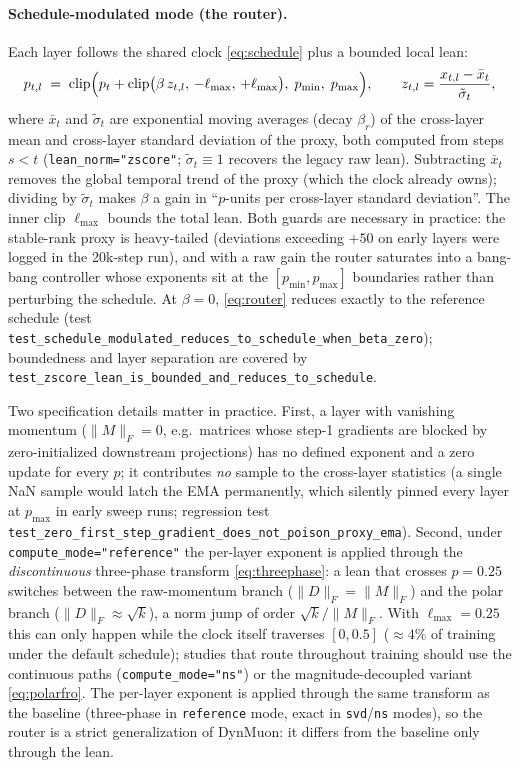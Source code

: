 \documentclass{article}
\DeclareMathOperator{\clip}{clip}
\begin{document}
\paragraph{Schedule-modulated mode (the router).} Each layer follows the
shared clock \eqref{eq:schedule} plus a bounded local lean:
\begin{equation}
\label{eq:router}
p_{t,l} \;=\; \clip\Bigl(p_t +
\clip\bigl(\beta\, z_{t,l},\, -\ell_{\max},\, +\ell_{\max}\bigr),\;
p_{\min},\; p_{\max}\Bigr),
\qquad
z_{t,l} = \frac{x_{t,l} - \bar{x}_t}{\tilde{\sigma}_t},
\end{equation}
where $\bar x_t$ and $\tilde\sigma_t$ are exponential moving averages (decay
$\beta_r$) of the cross-layer mean and cross-layer standard deviation of the
proxy, both computed from steps $s < t$ (\texttt{lean\_norm="zscore"};
$\tilde\sigma_t \equiv 1$ recovers the legacy raw lean). Subtracting
$\bar x_t$ removes the global temporal trend of the proxy (which the clock
already owns); dividing by $\tilde\sigma_t$ makes $\beta$ a gain in
``$p$-units per cross-layer standard deviation''. The inner clip
$\ell_{\max}$ bounds the total lean. Both guards are necessary in practice:
the stable-rank proxy is heavy-tailed (deviations exceeding $+50$ on early
layers were logged in the 20k-step run), and with a raw gain the router
saturates into a bang-bang controller whose exponents sit at the
$[p_{\min}, p_{\max}]$ boundaries rather than perturbing the schedule. At
$\beta = 0$, \eqref{eq:router} reduces exactly to the reference schedule
(test \texttt{test\_schedule\_modulated\_reduces\_to\_schedule\_when\_beta\_zero});
boundedness and layer separation are covered by
\texttt{test\_zscore\_lean\_is\_bounded\_and\_reduces\_to\_schedule}.

Two specification details matter in practice. First, a layer with vanishing
momentum ($\|M\|_F = 0$, e.g.\ matrices whose step-1 gradients are blocked by
zero-initialized downstream projections) has no defined exponent and a zero
update for every $p$; it contributes \emph{no} sample to the cross-layer
statistics (a single NaN sample would latch the EMA permanently, which
silently pinned every layer at $p_{\max}$ in early sweep runs; regression
test \texttt{test\_zero\_first\_step\_gradient\_does\_not\_poison\_proxy\_ema}).
Second, under \texttt{compute\_mode="reference"} the per-layer exponent is
applied through the \emph{discontinuous} three-phase transform
\eqref{eq:threephase}: a lean that crosses $p = 0.25$ switches between the
raw-momentum branch ($\|D\|_F = \|M\|_F$) and the polar branch
($\|D\|_F \approx \sqrt{k}$), a norm jump of order $\sqrt{k}/\|M\|_F$. With
$\ell_{\max} = 0.25$ this can only happen while the clock itself traverses
$[0, 0.5]$ ($\approx 4\%$ of training under the default schedule); studies
that route throughout training should use the continuous paths
(\texttt{compute\_mode="ns"}) or the magnitude-decoupled variant
\eqref{eq:polarfro}.
The per-layer exponent is applied through the same transform as the baseline
(three-phase in \texttt{reference} mode, exact in \texttt{svd}/\texttt{ns}
modes), so the router is a strict generalization of DynMuon: it differs from
the baseline only through the lean.
\end{document}
